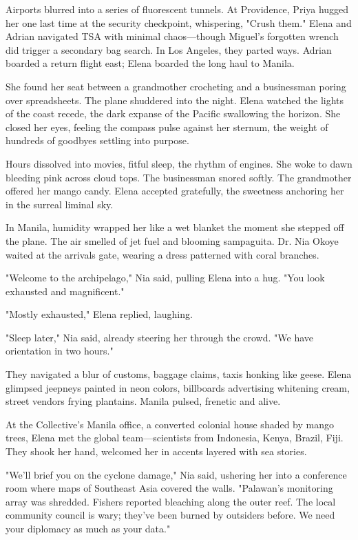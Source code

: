 \bigskip

Airports blurred into a series of fluorescent tunnels. At Providence, Priya hugged her one last time at the security checkpoint, whispering, "Crush them." Elena and Adrian navigated TSA with minimal chaos—though Miguel's forgotten wrench did trigger a secondary bag search. In Los Angeles, they parted ways. Adrian boarded a return flight east; Elena boarded the long haul to Manila.

She found her seat between a grandmother crocheting and a businessman poring over spreadsheets. The plane shuddered into the night. Elena watched the lights of the coast recede, the dark expanse of the Pacific swallowing the horizon. She closed her eyes, feeling the compass pulse against her sternum, the weight of hundreds of goodbyes settling into purpose.

Hours dissolved into movies, fitful sleep, the rhythm of engines. She woke to dawn bleeding pink across cloud tops. The businessman snored softly. The grandmother offered her mango candy. Elena accepted gratefully, the sweetness anchoring her in the surreal liminal sky.

In Manila, humidity wrapped her like a wet blanket the moment she stepped off the plane. The air smelled of jet fuel and blooming sampaguita. Dr. Nia Okoye waited at the arrivals gate, wearing a dress patterned with coral branches.

"Welcome to the archipelago," Nia said, pulling Elena into a hug. "You look exhausted and magnificent."

"Mostly exhausted," Elena replied, laughing.

"Sleep later," Nia said, already steering her through the crowd. "We have orientation in two hours."

They navigated a blur of customs, baggage claims, taxis honking like geese. Elena glimpsed jeepneys painted in neon colors, billboards advertising whitening cream, street vendors frying plantains. Manila pulsed, frenetic and alive.

At the Collective's Manila office, a converted colonial house shaded by mango trees, Elena met the global team—scientists from Indonesia, Kenya, Brazil, Fiji. They shook her hand, welcomed her in accents layered with sea stories.

"We'll brief you on the cyclone damage," Nia said, ushering her into a conference room where maps of Southeast Asia covered the walls. "Palawan's monitoring array was shredded. Fishers reported bleaching along the outer reef. The local community council is wary; they've been burned by outsiders before. We need your diplomacy as much as your data."

